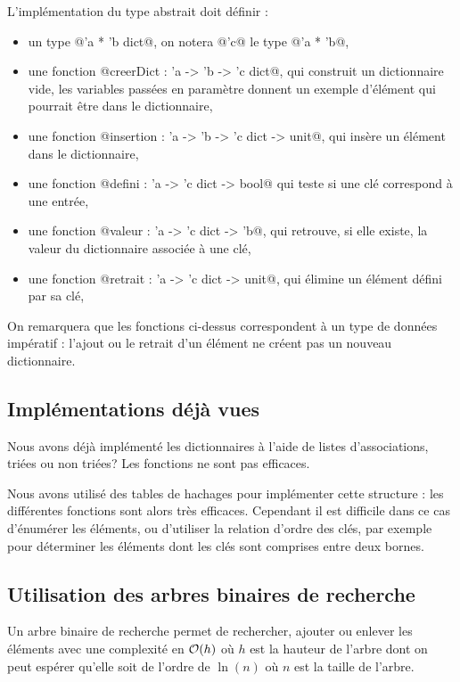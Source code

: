L'implémentation du type abstrait doit définir :
\begin{itemize}
\item un type @'a * 'b dict@, on notera @'c@ le type @'a * 'b@,
\item une fonction @creerDict : 'a ->  'b -> 'c dict@, qui construit un dictionnaire vide, les variables passées en paramètre donnent un exemple d'élément qui pourrait être dans le dictionnaire,

\item une fonction @insertion : 'a -> 'b -> 'c dict -> unit@, qui insère un élément dans le dictionnaire,
\item une fonction @defini : 'a -> 'c dict -> bool@ qui teste si une clé correspond à une entrée,
\item une fonction @valeur : 'a -> 'c dict -> 'b@, qui retrouve, si elle existe, la valeur du dictionnaire associée à une clé,
\item une fonction @retrait : 'a -> 'c dict -> unit@, qui élimine un élément défini par sa clé, 
\end{itemize}
On remarquera que les fonctions ci-dessus correspondent à un type de données impératif : l'ajout ou le retrait d'un élément ne créent pas un nouveau dictionnaire.
\subsection{Implémentations déjà vues}
Nous avons déjà implémenté les dictionnaires à l'aide de listes d'associations, triées ou non triées? Les fonctions ne sont pas efficaces.

Nous avons utilisé des tables de hachages pour implémenter cette structure : les différentes fonctions sont alors très efficaces. Cependant il est difficile dans ce cas d'énumérer les éléments, ou d'utiliser la relation d'ordre des clés, par exemple pour déterminer les éléments dont les clés sont comprises entre deux bornes.
\subsection{Utilisation des arbres binaires de recherche}
Un arbre binaire de recherche permet de rechercher, ajouter ou enlever les éléments avec une complexité en ${\cal O}(h)$ où $h$ est la hauteur de l'arbre dont on peut espérer qu'elle soit de l'ordre de $\ln(n)$ où $n$ est la taille de l'arbre.


